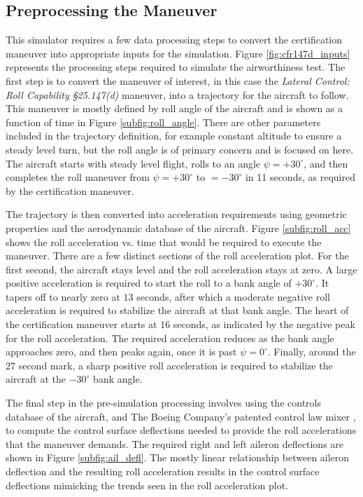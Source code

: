 \subsection{Preprocessing the Maneuver}

This simulator requires a few data processing steps to convert the certification maneuver into appropriate inputs for the simulation.
Figure \ref{fig:cfr147d_inputs} represents the processing steps required to simulate the airworthiness test. 
The first step is to convert the maneuver of interest, in this case the \textit{Lateral Control: Roll Capability \S 25.147(d)} maneuver, into a trajectory for the aircraft to follow. 
This maneuver is mostly defined by roll angle of the aircraft and is shown as a function of time in Figure \ref{subfig:roll_angle}.
There are other parameters included in the trajectory definition, for example constant altitude to ensure a steady level turn, but the roll angle is of primary concern and is focused on here. 
The aircraft starts with steady level flight, rolls to an angle $\psi = +30^\circ$, and then completes the roll maneuver from $\psi = +30^\circ$ to $=-30^\circ$ in 11 seconds, as required by the certification maneuver. 

The trajectory is then converted into acceleration requirements using geometric properties and the aerodynamic database of the aircraft.
Figure \ref{subfig:roll_acc} shows the roll acceleration vs. time that would be required to execute the maneuver.
There are a few distinct sections of the roll acceleration plot. 
For the first second, the aircraft stays level and the roll acceleration stays at zero.
A large positive acceleration is required to start the roll to a bank angle of $+30^\circ$. 
It tapers off to nearly zero at $13$ seconds, after which a moderate negative roll acceleration is required to stabilize the aircraft at that bank angle. 
The heart of the certification maneuver starts at $16$ seconds, as indicated by the negative peak for the roll acceleration.
The required acceleration reduces as the bank angle approaches zero, and then peaks again, once it is past $\psi=0^\circ$.
Finally, around the $27$ second mark, a sharp positive roll acceleration is required to stabilize the aircraft at the $-30^\circ$ bank angle. 

The final step in the pre-simulation processing involves using the controls database of the aircraft, and The Boeing Company's patented control law mixer \cite{control_law_patent}, to compute the control surface deflections needed to provide the roll accelerations that the maneuver demands. 
The required right and left aileron deflections are shown in Figure \ref{subfig:ail_defl}.
The mostly linear relationship between aileron deflection and the resulting roll acceleration results in the control surface deflections mimicking the trends seen in the roll acceleration plot. 

